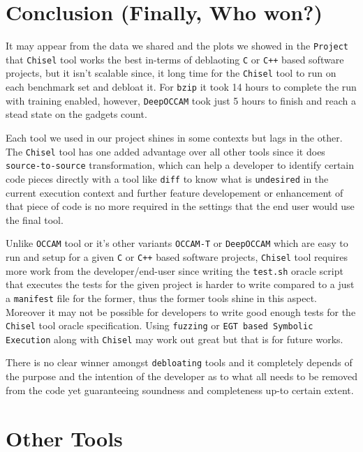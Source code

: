 \documentclass{relatorio}
\begin{document}
\section{Conclusion (Finally, Who won?)}%
\label{Tools}

It may appear from the data we shared and the plots we showed in the \texttt{Project} that \texttt{Chisel} tool works the best in-terms of deblaoting \texttt{C} or \texttt{C++} based software projects, but it isn't scalable since, it long time for the \texttt{Chisel} tool to run on each benchmark set and debloat it. For \texttt{bzip} it took 14 hours to complete the run with training enabled, however, \texttt{DeepOCCAM} took just 5 hours to finish and reach a stead state on the gadgets count.

Each tool we used in our project shines in some contexts but lags in the other. The \texttt{Chisel} tool has one added advantage over all other tools since it does \texttt{source-to-source} transformation, which can help a developer to identify certain code pieces directly with a tool like \texttt{diff} to know what is \texttt{undesired} in the current execution context and further feature developement or enhancement of that piece of code is no more required in the settings that the end user would use the final tool.

Unlike \texttt{OCCAM} tool or it's other variants \texttt{OCCAM-T} or \texttt{DeepOCCAM} which are easy to run and setup for a given \texttt{C} or \texttt{C++} based software projects, \texttt{Chisel} tool requires more work from the developer/end-user since writing the \texttt{test.sh} oracle script that executes the tests for the given project is harder to write compared to a just a \texttt{manifest} file for the former, thus the former tools shine in this aspect. Moreover it may not be possible for developers to write good enough tests for the \texttt{Chisel} tool oracle specification. Using \texttt{fuzzing} or \texttt{EGT based Symbolic Execution} along with \texttt{Chisel} may work out great but that is for future works. 

There is no clear winner amongst \texttt{debloating} tools and it completely depends of the purpose and the intention of the developer as to what all needs to be removed from the code yet guaranteeing soundness and completeness up-to certain extent.  

\section{Other Tools}%
\end{document}
